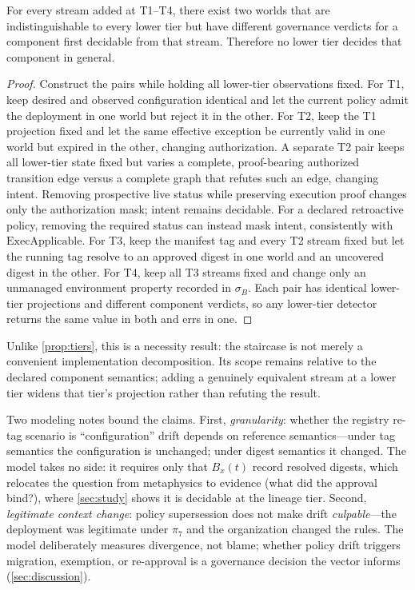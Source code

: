 \begin{proposition}
\label{prop:tier-minimality}
For every stream added at T1--T4, there exist two worlds that are
indistinguishable to every lower tier but have different governance verdicts
for a component first decidable from that stream. Therefore no lower tier
decides that component in general.
\end{proposition}
\begin{proof}
Construct the pairs while holding all lower-tier observations fixed. For T1,
keep desired and observed configuration identical and let the current policy
admit the deployment in one world but reject it in the other. For T2, keep the
T1 projection fixed and let the same effective exception be currently valid
in one world but expired in the other, changing authorization. A separate T2
pair keeps all lower-tier state fixed but varies a complete, proof-bearing
authorized transition edge versus a complete graph that refutes such an edge,
changing intent. Removing prospective live status while preserving execution
proof changes only the authorization mask; intent remains decidable. For a
declared retroactive policy, removing the required status can instead mask
intent, consistently with $\mathrm{ExecApplicable}$.
For T3, keep the manifest tag and every T2 stream fixed but let the running tag
resolve to an approved digest in one world and an uncovered digest in the
other. For T4, keep all T3 streams fixed and change only an unmanaged
environment property recorded in $\sigma_B$. Each pair has identical
lower-tier projections and different component verdicts, so any lower-tier
detector returns the same value in both and errs in one.
\end{proof}

Unlike \cref{prop:tiers}, this is a necessity result: the staircase is not
merely a convenient implementation decomposition. Its scope remains relative
to the declared component semantics; adding a genuinely equivalent stream at
a lower tier widens that tier's projection rather than refuting the result.

Two modeling notes bound the claims. First, \emph{granularity}: whether the
registry re-tag scenario is ``configuration'' drift depends on reference
semantics---under tag semantics the configuration is unchanged; under digest
semantics it changed. The model takes no side: it requires only that
$B_x(t)$ record resolved digests, which relocates the question from metaphysics
to evidence (what did the approval bind?), where \cref{sec:study} shows it is
decidable at the lineage tier. Second, \emph{legitimate context change}:
policy supersession does not make drift \emph{culpable}---the deployment was
legitimate under $\pi_7$ and the organization changed the rules. The model
deliberately measures divergence, not blame; whether policy drift triggers
migration, exemption, or re-approval is a governance decision the vector
informs (\cref{sec:discussion}).
